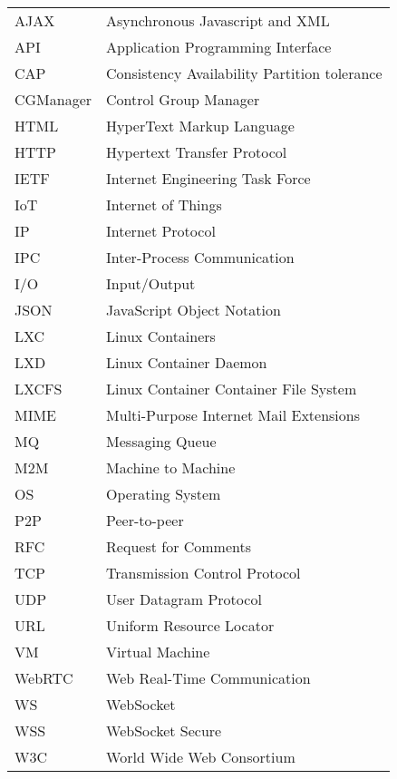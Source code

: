 \begin{longtable}{@{}p{}p{}@{}}
AJAX & Asynchronous Javascript and XML \\
API & Application Programming Interface \\
CAP & Consistency Availability Partition tolerance \\
CGManager & Control Group Manager \\
HTML & HyperText Markup Language \\
HTTP & Hypertext Transfer Protocol \\
IETF & Internet Engineering Task Force \\
IoT & Internet of Things \\
IP & Internet Protocol \\
IPC & Inter-Process Communication \\
I/O & Input/Output \\
JSON & JavaScript Object Notation \\
LXC & Linux Containers \\
LXD & Linux Container Daemon \\
LXCFS & Linux Container Container File System \\
MIME & Multi-Purpose Internet Mail Extensions \\
MQ & Messaging Queue \\
M2M & Machine to Machine \\
OS & Operating System \\
P2P & Peer-to-peer \\
RFC & Request for Comments \\
TCP & Transmission Control Protocol \\
UDP & User Datagram Protocol \\
URL & Uniform Resource Locator \\
VM & Virtual Machine \\
WebRTC & Web Real-Time Communication \\
WS & WebSocket \\
WSS & WebSocket Secure \\
W3C & World Wide Web Consortium \\


\end{longtable}
